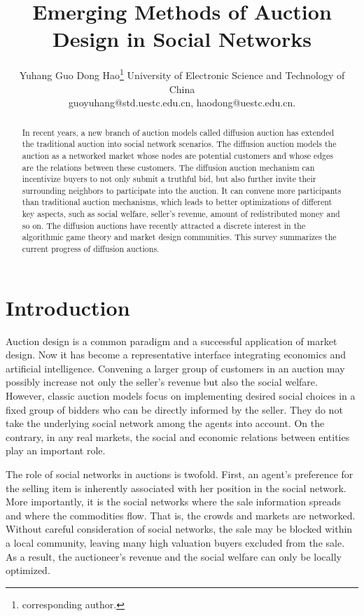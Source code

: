 \documentclass{article}
\title{Emerging Methods of Auction Design in Social Networks}
\author{
Yuhang Guo%
\And
Dong Hao\footnote{corresponding author.}%
\affiliations
University of Electronic Science and Technology of China\\

\emails
guoyuhang@std.uestc.edu.cn,
haodong@uestc.edu.cn.
}
\begin{document}
\maketitle

\begin{abstract}
% 
In recent years, a new branch of auction models called diffusion auction has extended the traditional auction into social network scenarios. The diffusion auction models the auction as a networked market whose nodes are potential customers and whose edges are the relations between these customers. The diffusion auction mechanism can incentivize buyers to not only submit a truthful bid, but also further invite their surrounding neighbors to participate into the auction. It can convene more participants than traditional auction mechanisms, which leads to better optimizations of different key aspects, such as social welfare, seller's revenue, amount of redistributed money and so on. The diffusion auctions have recently attracted a discrete interest in the algorithmic game theory and market design communities. This survey summarizes the current progress of diffusion auctions.
\end{abstract}
\section{Introduction}
Auction design is a common paradigm and a successful application of market design. Now it has become a representative interface integrating economics and artificial intelligence. Convening a larger group of customers  in an auction may possibly increase not only the seller's revenue but also the social welfare. However, classic auction models focus on implementing desired social choices in a fixed group of bidders who can be directly informed by the seller. They do not take the underlying social network among the agents into account. On the contrary, in any real markets, the social and economic relations between entities play an important role. 

The role of social networks in auctions is twofold. First, an agent's preference for the selling item is inherently associated with her position in the social network. More importantly, it is the social networks where the sale information spreads and where the commodities flow. That is, the crowds and markets are networked. Without careful consideration of social networks, the sale may be blocked within a local community, leaving many high valuation buyers excluded from the sale. As a result, the auctioneer's revenue and the social welfare can only be locally optimized. 
\end{document}
